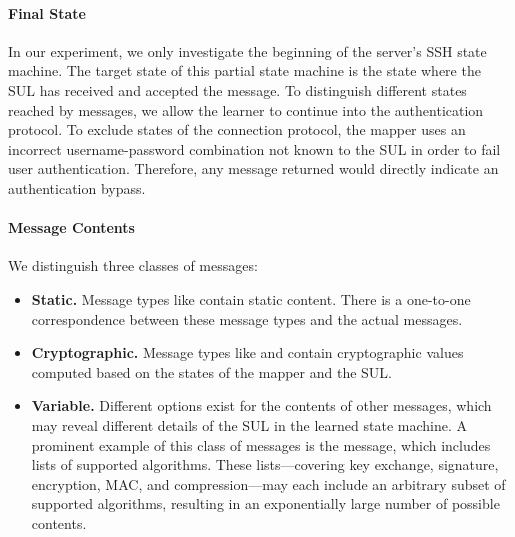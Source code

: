\paragraph{Final State}

In our experiment, we only investigate the beginning of the server's SSH state machine. The target state of this partial state machine is the state where the SUL has received and accepted the \msgservicerequest message. To distinguish different states reached by \msgservicerequest messages, we allow the learner to continue into the authentication protocol. To exclude states of the connection protocol, the mapper uses an incorrect username-password combination not known to the SUL in order to fail user authentication. Therefore, any \msguserauthsuccess message returned would directly indicate an authentication bypass.

\paragraph{Message Contents}

We distinguish three classes of messages:
\begin{itemize}
    \item \textbf{Static.} Message types like \msgnewkeys contain static content. There is a one-to-one correspondence between these message types and the actual messages.
    \item \textbf{Cryptographic.} Message types like \msgkexecdhinit and \msgkexecdhreply contain cryptographic values computed based on the states of the mapper and the SUL.
    \item \textbf{Variable.} Different options exist for the contents of other messages, which may reveal different details of the SUL in the learned state machine. A prominent example of this class of messages is the \msgkexinit message, which includes lists of supported algorithms. These lists---covering key exchange, signature, encryption, MAC, and compression---may each include an arbitrary subset of supported algorithms, resulting in an exponentially large number of possible contents.
\end{itemize}

